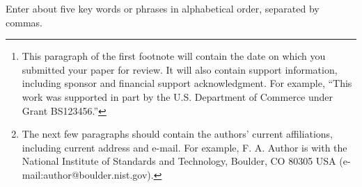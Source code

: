 \documentclass[journal,twoside,web]{ieeecolor}
\begin{document}
\title{}

\author{Georg Schramm and Martin Holler

\thanks{This paragraph of the first footnote will contain the date on which
you submitted your paper for review. It will also contain support information,
including sponsor and financial support acknowledgment. For example, 
``This work was supported in part by the U.S. Department of Commerce under Grant BS123456.'' }
\thanks{The next few paragraphs should contain the authors' current affiliations,
including current address and e-mail. For example, F. A. Author is with the
National Institute of Standards and Technology, Boulder, CO 80305 USA (e-mail:author@boulder.nist.gov). }
}

\maketitle

\begin{abstract}

\end{abstract}

\begin{IEEEkeywords}
Enter about five key words or phrases in alphabetical order, separated by commas.
\end{IEEEkeywords}



\printbibliography
\end{document}
